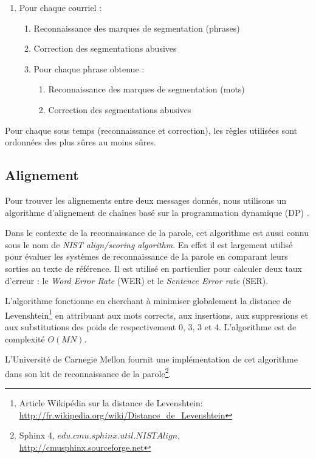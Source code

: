 \begin{enumerate}
    \item[] Pour chaque courriel :
    \begin{enumerate}
        \item Reconnaissance des marques de segmentation (phrases)
        \item Correction des segmentations abusives
        \item Pour chaque phrase obtenue :
        \begin{enumerate}
            \item Reconnaissance des marques de segmentation (mots)
            \item Correction des segmentations abusives
        \end{enumerate}
    \end{enumerate}
\end{enumerate}

Pour chaque sous temps (reconnaissance et correction), les règles utilisées sont ordonnées des plus sûres au moins sûres.

\subsection{Alignement}

\label{subsec:alignment}

Pour trouver les alignements entre deux messages donnés, nous utilisons un algorithme d'alignement de chaînes basé sur la programmation dynamique (DP) \cite{sankoff:1983}. 

Dans le contexte de la reconnaissance de la parole, cet algorithme est aussi connu sous le nom de \textit{NIST align/scoring algorithm}. En effet il est largement utilisé pour évaluer les systèmes de reconnaissance de la parole en comparant leurs sorties au texte de référence. Il est utilisé en particulier pour calculer deux taux d'erreur : le \textit{Word Error Rate} (WER) et le \textit{Sentence Error rate} (SER).

L'algorithme fonctionne en cherchant à minimiser globalement la distance de Levenshtein\footnote{Article Wikipédia sur la distance de Levenshtein: \url{http://fr.wikipedia.org/wiki/Distance_de_Levenshtein}} \cite{levenshtein1966binary} en attribuant aux mots corrects, aux insertions, aux suppressions et aux substitutions des poids de respectivement 0, 3, 3 et 4. L'algorithme est de complexité $O(MN)$.

L'Université de Carnegie Mellon fournit une implémentation de cet algorithme dans son kit de reconnaissance de la parole\footnote{Sphinx 4, $edu.cmu.sphinx.util.NISTAlign$, \url{http://cmusphinx.sourceforge.net}}.

